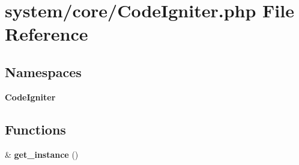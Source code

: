 \section{system/core/\-Code\-Igniter.php File Reference}
\label{_code_igniter_8php}
\subsection*{Namespaces}
\begin{DoxyCompactItemize}
\item 
{\bf Code\-Igniter}
\end{DoxyCompactItemize}
\subsection*{Functions}
\begin{DoxyCompactItemize}
\item 
\& {\bf get\-\_\-instance} ()
\end{DoxyCompactItemize}
